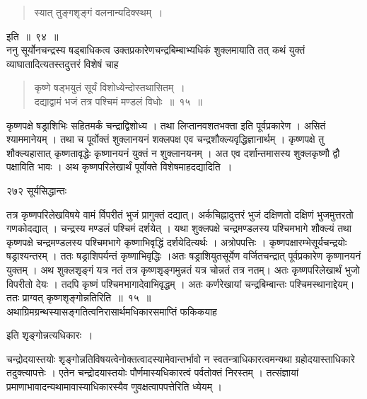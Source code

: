 \documentclass[11pt, openany]{book}
\begin{document}
\begin{quote}
{\qt स्यात् तुङ्गशृङ्गं वलनान्यदिक्स्थम्~।}
\end{quote}
इति~॥~९४~॥\\
ननु सूर्योनचन्द्रस्य षड्बाधिकत्व उक्तप्रकारेणचन्द्रबिम्बाभ्यधिकं शुक्लमायाति तत् कथं युक्तं व्याघातादित्यतस्तदुत्तरं विशेषं चाह\textendash 

\begin{quote}
{\ssi कृष्णे षड्भयुतं सूर्यं विशोध्येन्दोस्तथासितम्~।\\
 दद्याद्वामं भजं तत्र पश्चिमं मण्डलं विधोः~॥~१५~॥ }
\end{quote}
 कृष्णपक्षे षड्राशिभिः सहितमर्कं चन्द्राद्विशोध्य । तथा लिप्तानवशतभक्ता इति पूर्वप्रकारेण । असितं श्याममानेयम् । तथा च पूर्वोक्तं शुक्लानयनं शक्लपक्ष एव चन्द्रशौक्ल्यवृद्धिज्ञानार्थम् । कृष्णपक्षे तु शौक्ल्यहासात् कृष्णतावृद्धेः कृष्णानयनं युक्तं न शुक्लानयनम् । अत एव दर्शान्तमासस्य शुक्लकृष्णौ द्वौ पक्षाविति भावः । अथ कृष्णपरिलेखार्थं पूर्वोक्ते विशेषमाह\textendash दद्यादिति~।


\newpage

\noindent २७२ \hspace{4cm} सूर्यसिद्धान्तः
\vspace{1cm}


\noindent तत्र कृष्णपरिलेखविषये वामं र्विपरीतं भुजं प्रागुक्तं दद्यात्। अर्कचिह्नादुत्तरं भुजं दक्षिणतो दक्षिणं भुजमुत्तरतो गणकोदद्यात् । चन्द्रस्य मण्डलं पश्चिमं दर्शयेत् । यथा शुक्लपक्षे चन्द्रमण्डलस्य पश्चिमभागे शौक्ल्यं तथा कृष्णपक्षे चन्द्रमण्डलस्य पश्चिमभागे कृष्णाभिवृद्धिं दर्शयेदित्यर्थः । अत्रोपपत्तिः । कृष्णपक्षारम्भेसूर्यचन्द्रयोः षड्राश्यन्तरम् । ततः षड्राशिपर्यन्तं कृष्णाभिवृद्धिः ।अतः षड्राशियुतसूर्येण वर्जितचन्द्रात् पूर्वप्रकारेण कृष्णानयनं युक्तम् । अथ शुक्लशृङ्गं यत्र नतं तत्र कृष्णशृङ्गमुन्नतं यत्र चोन्नतं तत्र नतम्। अतः कृष्णपरिलेखार्थं भुजो विपरीतो देयः । तदपि कृष्णं पश्चिमभागादेवाभिवृद्धम् । अतः कर्णरेखायां चन्द्रबिम्बान्तः पश्चिमस्थानाद्देयम्। ततः प्राग्वत् कृष्णशृङ्गोन्नतिरिति~॥~१५~॥\\ 
\noindent अथाग्रिमग्रन्थस्यासङ्गतित्वनिरासार्थमधिकारसमाप्तिं फकिकयाह\textendash

\begin{center}
इति शृङ्गोन्नत्यधिकारः~। 
\end{center}

 चन्द्रोदयास्तयोः शृङ्गोन्नतिविषयत्वेनोक्तत्वादस्यामेवान्तर्भावो न स्वतन्त्राधिकारत्वमन्यथा ग्रहोदयास्ताधिकारे तदुक्त्यापत्तेः । एतेन चन्द्रोदयास्तयोः पौर्णमास्यधिकारत्वं पर्वतोक्तं निरस्तम् । तत्संज्ञायां प्रमाणाभावादन्यथामावास्याधिकारस्यैव णुवक्षत्वापपत्तेरिति ध्येयम् । 
\end{document}
